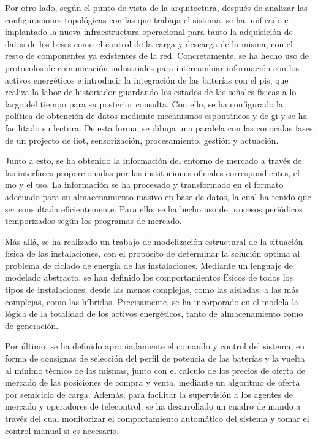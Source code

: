 Por otro lado, según el punto de vista de la arquitectura, después de analizar las configuraciones topológicas con las que trabaja el sistema, se ha unificado e implantado la nueva infraestructura operacional para tanto la adquisición de datos de los \glspl{bess} como el control de la carga y descarga de la misma, con el resto de componentes ya existentes de la red. Concretamente, se ha hecho uso de protocolos de comunicación industriales para intercambiar información con los activos energéticos e introducir la integración de las baterías con el \gls{pis}, que realiza la labor de historiador guardando los estados de las señales físicas a lo largo del tiempo para su posterior consulta. Con ello, se ha configurado la política de obtención de datos mediante mecanismos espontáneos y de \gls{gi} y se ha facilitado su lectura. De esta forma, se dibuja una paralela con las conocidas fases de un projecto de \gls{iiot}, sensorización, procesamiento, gestión y actuación.

Junto a esto, se ha obtenido la información del entorno de mercado a través de las interfaces proporcionadas por las instituciones oficiales correspondientes, el \gls{mo} y el \gls{tso}. La información se ha procesado y transformado en el formato adecuado para su almacenamiento masivo en base de datos, la cual ha tenido que ser consultada eficientemente. Para ello, se ha hecho uso de procesos periódicos temporizados según los programas de mercado.

Más allá, se ha realizado un trabajo de modelización estructural de la situación física de las instalaciones, con el propósito de determinar la solución optima al problema de ciclado de energía de las instalaciones. Mediante un lenguaje de modelado abstracto, se han definido los comportamientos físicos de todos los tipos de instalaciones, desde las menos complejas, como las aisladas, a las más complejas, como las híbridas. Precisamente, se ha incorporado en el modela la lógica de la totalidad de los activos energéticos, tanto de almacenamiento como de generación.

Por último, se ha definido apropiadamente el comando y control del sistema, en forma de consignas de selección del perfil de potencia de las baterías y la vuelta al mínimo técnico de las mismas, junto con el calculo de los precios de oferta de mercado de las posiciones de compra y venta, mediante un algoritmo de oferta por semiciclo de carga. Además, para facilitar la supervisión a los agentes de mercado y operadores de telecontrol, se ha desarrollado un cuadro de mando a través del cual monitorizar el comportamiento automático del sistema y tomar el control manual si es necesario.

